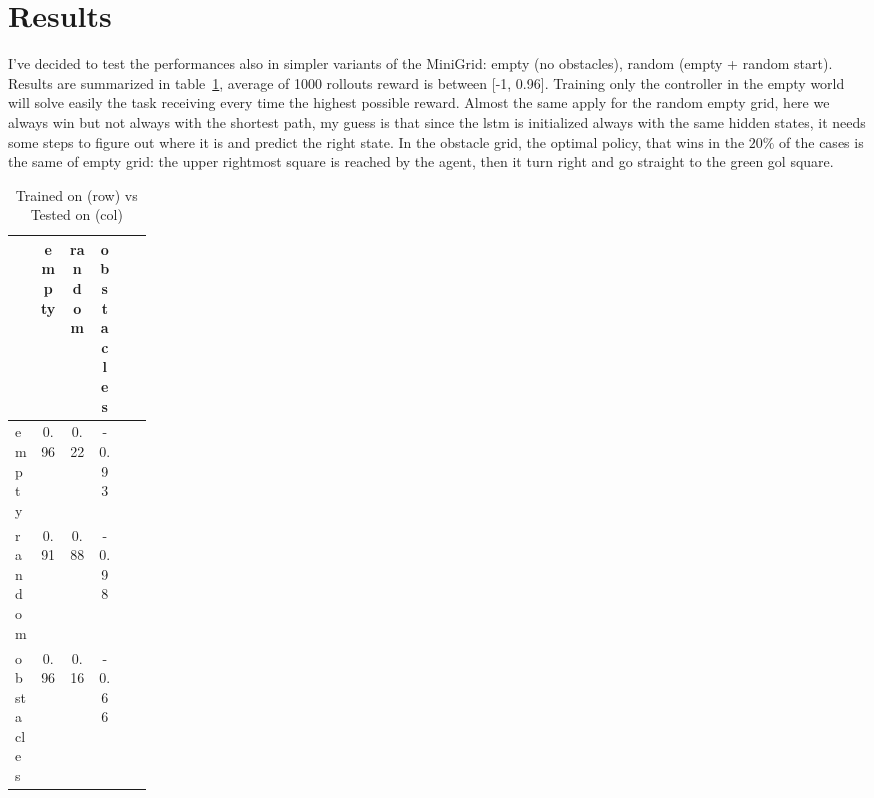 \documentclass{article}
\begin{document}
\section{Results}
I've decided to test the performances also in simpler variants of the MiniGrid: empty (no obstacles), random (empty + random start). 
Results are summarized in table~\ref{tab:results}, average of 1000 rollouts reward is between [-1, 0.96].
Training only the controller in the empty world will solve easily the task receiving every time the highest possible reward. 
Almost the same apply for the random empty grid, here we always win but not always with the shortest path, my guess is that since the
lstm is initialized always with the same hidden states, it needs some steps to figure out where it is and predict the right state.
In the obstacle grid,
the optimal policy, that wins in the $20\%$ of the cases is the same of empty grid: the upper rightmost square is reached by the agent, then it turn right and go straight to the green gol square.  


\begin{table}[h!]
    \caption{Trained on (row) vs Tested on (col)}
    \label{tab:results}
    \begin{center}
    \begin{small}
    \begin{tabular}{p{0.16\linewidth} | ccccc}
    \toprule
    & empty & random & obstacles \\
    \midrule
    empty      & 0.96 & 0.22 & -0.93 \\
    random     & 0.91 & 0.88 & -0.98 \\
    obstacles     & 0.96 & 0.16 & -0.66 \\
    \bottomrule
    \end{tabular}
    \end{small}
    \end{center}
    \vspace{-0.5cm}
\end{table}
\end{document}
